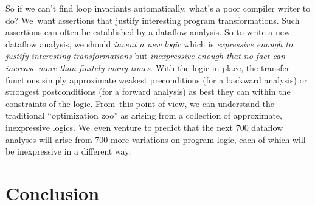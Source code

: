 \documentclass[blockstyle,preprint,nocopyrightspace]{sigplanconf}
\newcommand\join{\sqcup}
\newcommand\true{\ensuremath{\mathbf{true}}}
\newcommand\implies{\supseteq}  %
\newcommand\secref[1]{Section~\ref{sec:#1}}
\begin{document}
So if we can't find loop invariants automatically, what's a poor
compiler writer to do?
We~want assertions that justify interesting program
transformations. 
Such assertions can often be established by a dataflow analysis.
So to write a new dataflow analysis, we
should \emph{invent a new logic} which is
\emph{expressive enough to justify interesting transformations}
but \emph{inexpressive enough that no fact can increase more than
finitely many times}.
With the logic in place, the transfer functions simply approximate
  weakest preconditions (for a backward analysis) or strongest
  postconditions (for a forward analysis) as best they can within the
  constraints of the logic.
From~this point of view, we can understand the traditional
``optimization zoo'' as arising from a collection of approximate,
inexpressive logics. 
We~even venture to predict that the next 700 dataflow analyses will
arise from 700 more variations on 
program logic, each of which will be inexpressive in a different way.




\section{Conclusion}
\end{document}
